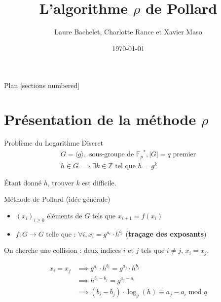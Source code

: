 \documentclass{beamer}
\title{L'algorithme $\rho$ de Pollard}
\date{\today}
\author{Laure Bachelet, Charlotte Rance et Xavier Maso}
\institute{Master CSI, Université de Bordeaux}
\begin{document}
  \maketitle

  \begin{frame}{Plan}
    [sections numbered]
    \tableofcontents[hideallsubsections]
  \end{frame}


  \section{Présentation de la méthode $\rho$}

  \begin{frame}{Problème du Logarithme Discret}
    \begin{align*}
      G = \langle g \rangle, \text{\ sous-groupe de }{\mathbb{F}_p}^*, |G| = q \text{\ premier} \\
      h \in G \implies \exists k \in \mathbb{Z} \text{\ tel que } h = g^k
    \end{align*}

    \bigskip
    Étant donné $h$, trouver $k$ est difficile.
  \end{frame}


  \begin{frame}{Méthode de Pollard (idée générale)}
    \begin{itemize}
      \item $(x_i)_{i \ge 0}$ éléments de $G$ tels que $x_{i+1} = f(x_i)$
      \item $f: G \rightarrow G$ telle que : $\forall i, x_i = g^{a_i} \cdot h^{b_i}$ (\textbf{traçage des exposants})
    \end{itemize}


    On cherche une collision : deux indices $i$ et $j$ tels que $i \ne j$, $x_i = x_j$.

    \begin{align*}
      x_i = x_j &\implies g^{a_i} \cdot h^{b_i} = g^{a_j} \cdot h^{b_j} \\
                &\implies h^{b_i - b_j} = g^{a_j - a_i} \\
                &\implies (b_i - b_j) \cdot \log_g(h) \equiv a_j - a_i \text{\ mod } q
    \end{align*}
  \end{frame}
\end{document}
